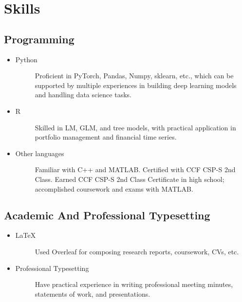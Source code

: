 \documentclass[a4paper]{article}
\begin{document}
\section{Skills}

\subsection{Programming}
\begin{itemize}
    \item\begin{description}
            \item[Python] Proficient in PyTorch, Pandas, Numpy, sklearn, etc., which can be supported by multiple experiences in building deep learning models and handling data science tasks.
    \end{description}
    \item\begin{description}
        \item[R] Skilled in LM, GLM, and tree models, with practical application in portfolio management and financial time series.
    \end{description}
    \item \begin{description}
        \item[Other languages] Familiar with C++ and MATLAB. Certified with CCF CSP-S 2nd Class. 
        Earned CCF CSP-S 2nd Class Certificate in high school; accomplished coursework and exams with MATLAB.
    \end{description}
\end{itemize}

\subsection{Academic And Professional Typesetting}
\begin{itemize}
    \item\begin{description}
        \item[\LaTeX] Used Overleaf for composing research reports, coursework, CVs, etc. 
    \end{description}
    \item \begin{description}
        \item[Professional Typesetting] Have practical experience in writing professional meeting minutes, statements of work, and presentations. 
    \end{description}
\end{itemize} 
\end{document}
